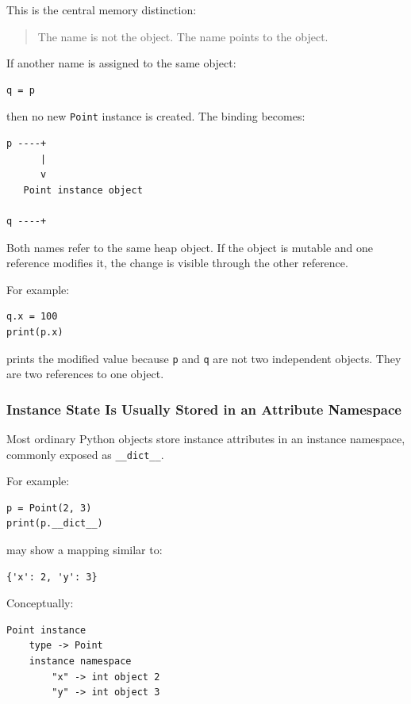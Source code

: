 This is the central memory distinction:

\begin{quote}
The name is not the object. The name points to the object.
\end{quote}

If another name is assigned to the same object:

\begin{verbatim}
q = p
\end{verbatim}

then no new \texttt{Point} instance is created. The binding becomes:

\begin{verbatim}
p ----+
      |
      v
   Point instance object

q ----+
\end{verbatim}

Both names refer to the same heap object. If the object is mutable and one reference modifies it, the change is visible through the other reference.

For example:

\begin{verbatim}
q.x = 100
print(p.x)
\end{verbatim}

prints the modified value because \texttt{p} and \texttt{q} are not two independent objects. They are two references to one object.

\subsubsection*{Instance State Is Usually Stored in an Attribute Namespace}

Most ordinary Python objects store instance attributes in an instance namespace, commonly exposed as \texttt{\_\_dict\_\_}.

For example:

\begin{verbatim}
p = Point(2, 3)
print(p.__dict__)
\end{verbatim}

may show a mapping similar to:

\begin{verbatim}
{'x': 2, 'y': 3}
\end{verbatim}

Conceptually:

\begin{verbatim}
Point instance
    type -> Point
    instance namespace
        "x" -> int object 2
        "y" -> int object 3
\end{verbatim}


